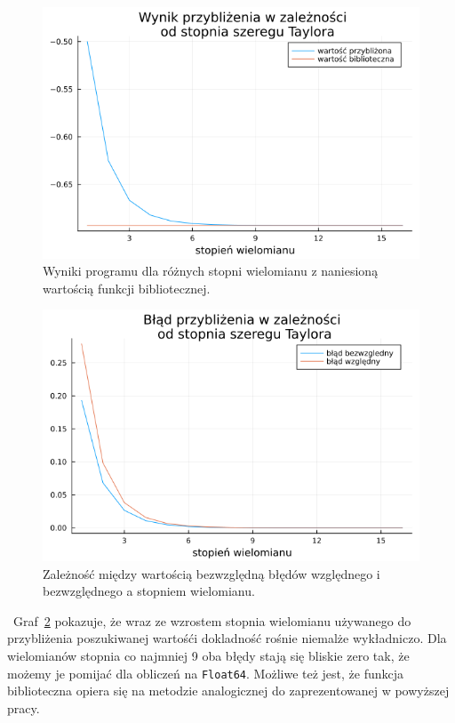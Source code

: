 \documentclass[11pt, wide, leqno]{mwart}
\begin{document}
\begin{figure}[h!]
    \centering
    \includegraphics[scale=0.6]{./prog/val_plot.png}
    \caption{Wyniki programu dla różnych stopni wielomianu z naniesioną wartością funkcji bibliotecznej.\label{fg:val}}
\end{figure}

\begin{figure}[h!]
    \centering
    \includegraphics[scale=0.6]{./prog/err_plot.png}
    \caption{Zależność między wartością bezwzględną błędów względnego i bezwzględnego a stopniem wielomianu.\label{fg:err}}
\end{figure}

\newpage

~Graf~\ref{fg:err} pokazuje, że wraz ze wzrostem stopnia wielomianu używanego do przybliżenia poszukiwanej wartośći dokladność rośnie niemalże wykładniczo. Dla wielomianów stopnia co najmniej 9 oba błędy stają się bliskie zero tak, że możemy je pomijać dla obliczeń na \verb+Float64+. Możliwe też jest, że funkcja biblioteczna opiera się na metodzie analogicznej do zaprezentowanej w powyższej pracy.

\koniec
\end{document}
